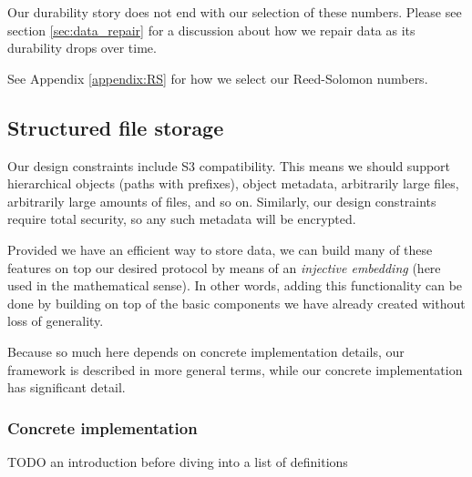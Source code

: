 \documentclass[a4paper,10pt]{article} \usepackage[utf8]{inputenc}
\newcommand{\todo}[1]{{\color{red} TODO #1 }}
\begin{document}
Our durability story does not end with our selection of these numbers.
Please see section \ref{sec:data_repair} for a discussion about how we repair
data as its durability drops over time.

See Appendix \ref{appendix:RS} for how we select our Reed-Solomon numbers.

\subsection{Structured file storage}

Our design constraints include S3 compatibility. This means we should support
hierarchical objects (paths with prefixes), object metadata, arbitrarily large
files, arbitrarily large amounts of files, and so on. Similarly, our design
constraints require total security, so any such metadata will be encrypted.

Provided we have an efficient way to store data, we can build many of these
features on top our desired protocol by means of an {\em injective embedding} 
(here used in the mathematical sense). 
In other words, adding this functionality can be done by
building on top of the basic components we have already created without loss of
generality.

Because so much here depends on concrete
implementation details, our framework is described in more general terms, while our concrete implementation has significant detail.

\subsubsection{Concrete implementation}

\todo{an introduction before diving into a list of definitions}
\end{document}
